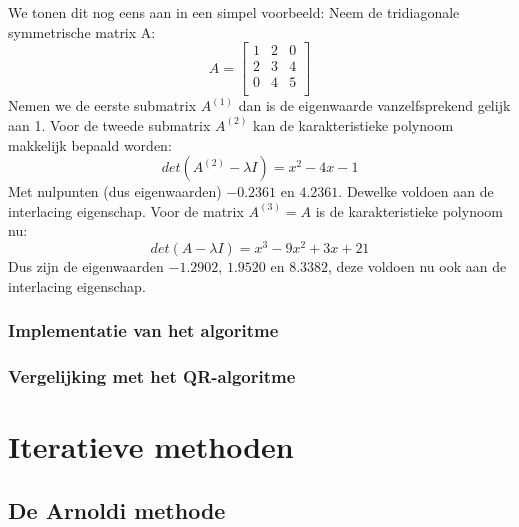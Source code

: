 \documentclass[a4paper]{article}
\begin{document}
	We tonen dit nog eens aan in een simpel voorbeeld: 
	Neem de tridiagonale symmetrische matrix A:
	\[ A =
		\begin{bmatrix*}
			1 & 2 & 0 \\
			2 & 3 & 4 \\
			0 & 4 & 5 \\ 
		\end{bmatrix*}
	\]
	Nemen we de eerste submatrix $A^{(1)}$ dan is de eigenwaarde vanzelfsprekend gelijk aan 1.
	Voor de tweede submatrix $A^{(2)}$ kan de karakteristieke polynoom makkelijk bepaald worden: 
	\[
		det(A^{(2)} - \lambda I) = x^2 - 4x - 1 
	\]
	Met nulpunten (dus eigenwaarden) $-0.2361$ en $4.2361$. Dewelke voldoen aan de interlacing eigenschap.
	Voor de matrix $A^{(3)} = A$ is de karakteristieke polynoom nu:
	\[
		det(A - \lambda I) = x^3 -9x^2 + 3x + 21
	\]
	Dus zijn de eigenwaarden $-1.2902$, $1.9520$ en $8.3382$, deze voldoen nu ook aan de interlacing eigenschap.
		
\subsubsection{Implementatie van het algoritme}
\subsubsection{Vergelijking met het QR-algoritme}

\section{Iteratieve methoden}
\subsection{De Arnoldi methode}
\end{document}

